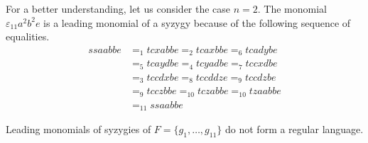 \documentclass[sigconf]{acmart}
\theoremstyle{plain}
\theoremstyle{definition}
\theoremstyle{remark}
\begin{document}
For a better understanding, let us consider the case $n=2$. The monomial $\varepsilon_{11}a^2b^2e$ is a leading monomial of a syzygy because of the following sequence of equalities.
\begin{align*}
ssaabbe & =_{1} tcxabbe =_{2} tcaxbbe =_{6} tcadybe \\
& =_{5} tcaydbe =_{4} tcyadbe =_{7} tccxdbe \\
& =_{3} tccdxbe =_{8} tccddze =_{9} tccdzbe \\
& =_{9} tcczbbe =_{10} tczabbe =_{10} tzaabbe \\
& =_{11} ssaabbe
\end{align*}


\begin{proposition}
  Leading monomials of syzygies of $F=\{g_1,\dots,g_{11}\}$ do not form a regular language.
  \label{prop:exp_pas_regulier}
\end{proposition}
\end{document}
